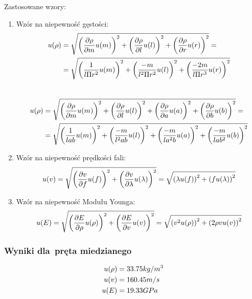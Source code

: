 \documentclass{fizraport}
\begin{document}
Zastosowane wzory:
\begin{enumerate}
    \item Wzór na niepewność gęstości:\\
    \begin{align*}
    \small
    u(\rho)&=\sqrt{\left(\frac{\partial \rho}{\partial m}u(m)\right)^2+\left(\frac{\partial \rho}{\partial l}u(l)\right)^2+\left(\frac{\partial \rho}{\partial r}u(r)\right)^2}=\\ &= \sqrt{\left(\frac{1}{l\Pi r^2}u(m)\right)^2+\left(\frac{-m}{l^2 \Pi r^2}u(l)\right)^2+\left(\frac{-2m}{l\Pi r^3}u(r)\right)^2}
    \end{align*}\\
    \begin{align*}
    \small
    u(\rho)&=\sqrt{\left(\frac{
    \partial \rho}
    {\partial m}u(m)\right)^2+
    \left(\frac{\partial \rho}
    {\partial l}u(l)\right)^2+
    \left(\frac{\partial \rho
    }{\partial a}u(a)\right)^2+
    \left(\frac{\partial \rho
    }{\partial b}u(b)\right)^2}=\\&=
    \sqrt{\left(\frac{
    1}
    {lab}u(m)\right)^2+
    \left(\frac{-m}
    {l^2ab}u(l)\right)^2+
    \left(\frac{-m
    }{la^2b}u(a)\right)^2+
    \left(\frac{-m
    }{lab^2}u(b)\right)^2}
    \end{align*}
    \item Wzór na niepewność prędkości fali:\\
    \[\small u(v)=\sqrt{\left(\frac{\partial v}{\partial f}u(f)\right)^2+\left(\frac{\partial v}{\partial \lambda}u(\lambda)\right)^2}=\sqrt{\left(\lambda u(f)\right)^2+\left(f u(\lambda)\right)^2}\]
	
	\item Wzór na niepewność Modułu Younga:\\
	\[\small u(E)=\sqrt{\left(\frac{\partial E}{\partial \rho}u(\rho)\right)^2+\left(\frac{\partial E}{\partial v}u(v)\right)^2} =
	\sqrt{\left(v^2 u(\rho)\right)^2+\left(2 \rho v u(v)\right)^2}\]
\end{enumerate}

\subsubsection{Wyniki dla~pręta miedzianego}
\begin{align*}
\small
 u(\rho)&=33.75 kg/m^3\\%
 u(v)&= 160.45 m/s\\
u(E)&= 19.33 GPa%
\end{align*}
\end{document}
